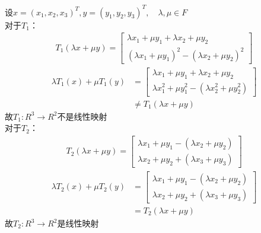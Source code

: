 \documentclass{article}
\begin{document}
\section{}
设$ x=(x_1,x_2,x_3)^{T},y=(y_1,y_2,y_3)^{T},\quad\lambda,\mu\in F $\\
对于$ T_1 $：
\begin{equation}
	\begin{aligned}
		T_1(\lambda x+\mu y)=\begin{bmatrix} \lambda x_1+\mu y_1+\lambda x_2+\mu y_2 \\ (\lambda x_1+\mu y_1)^2-(\lambda x_2+\mu y_2 )^2\end{bmatrix}
	\end{aligned}
\end{equation}
\begin{equation}
	\begin{aligned}
		\lambda  T_1(x)+\mu T_1(y)&=\begin{bmatrix} \lambda x_1+\mu y_1+\lambda x_2+\mu y_2 \\ \lambda x_1^2+\mu y_1^2-(\lambda x_2^2+\mu y_2^2 )\end{bmatrix}\\
		&\neq T_1(\lambda x+\mu y)
	\end{aligned}
\end{equation}
故$T_1:R^3\to R^2  $不是线性映射\\
对于$ T_2 $：
\begin{equation}
	\begin{aligned}
		T_2(\lambda x+\mu y)=\begin{bmatrix} \lambda x_1+\mu y_1-(\lambda x_2+\mu y_2) \\ \lambda x_2+\mu y_2+(\lambda x_3+\mu y_3)\end{bmatrix}
	\end{aligned}
\end{equation}
\begin{equation}
	\begin{aligned}
			\lambda  T_2(x)+\mu T_2(y)&=\begin{bmatrix} \lambda x_1+\mu y_1-(\lambda x_2+\mu y_2) \\ \lambda x_2+\mu y_2+(\lambda x_3+\mu y_3)\end{bmatrix}\\
		&= T_2(\lambda x+\mu y)
	\end{aligned}
\end{equation}
故$T_2:R^3\to R^2  $是线性映射
\end{document}
